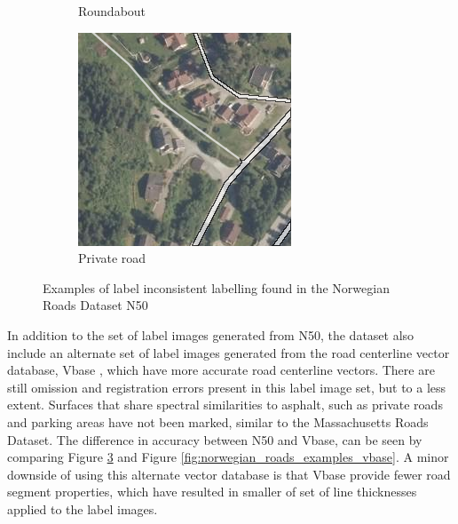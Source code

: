 \begin{figure}[h]
\begin{subfigure}{0.31\textwidth}
\caption{Roundabout} \label{fig:norwegian_roads_roundabout_n50}
\end{subfigure}
\hspace*{\fill} %
\begin{subfigure}{0.31\textwidth}
\includegraphics[width=\linewidth]{figs/datasets/nor_examples/1157_missing_n50.png}
\caption{Private road} \label{fig:norwegian_roads_missing_n50}
\end{subfigure}
\hspace*{\fill} %
\caption{Examples of label inconsistent labelling found in the Norwegian Roads Dataset N50} \label{fig:norwegian_roads_examples_n50}
\end{figure}

In addition to the set of label images generated from N50, the dataset also include an alternate set of label images generated from the road centerline vector database, Vbase \citep{Kartverket_vbase}, which have more accurate road centerline vectors. There are still omission and registration errors present in this label image set, but to a less extent. Surfaces that share spectral similarities to asphalt, such as private roads and parking areas have not been marked, similar to the Massachusetts Roads Dataset. The difference in accuracy between N50 and Vbase, can be seen by comparing Figure \ref{fig:norwegian_roads_examples_n50} and Figure \ref{fig:norwegian_roads_examples_vbase}. A minor downside of using this alternate vector database is that Vbase provide fewer road segment properties, which have resulted in smaller of set of line thicknesses applied to the label images.\\

